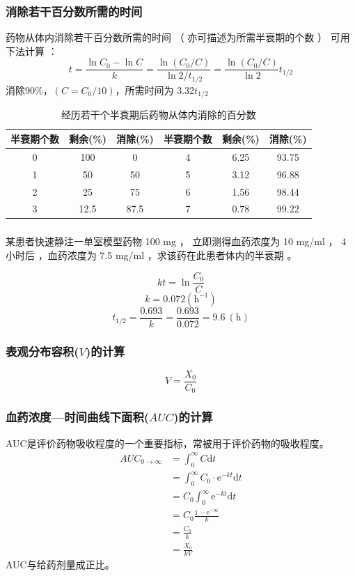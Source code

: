 \documentclass[dvipsnames, svgnames, x11names]{beamer}
\begin{document}
\begin{frame}[t]
    \frametitle{消除若干百分数所需的时间}    
    药物从体内消除若干百分数所需的时间 （ 亦可描述为所需半衰期的个数 ） 可用下法计算 ：
    \[
        t=\frac{\ln C_{0}-\ln C}{k}=\frac{\ln(C_{0}/C)}{\ln2/t_{1/2}}=\frac{\ln(C_{0}/C)}{\ln2}t_{1/2}
    \]
    消除90\%，$(C=C_{0}/10)$，所需时间为 3.32$t_{1/2}$
    \begin{table}
        \centering
        \begin{tabular}{ccc|ccc}
            \bottomrule
            半衰期个数 & 剩余(\%) & 消除(\%) & 半衰期个数 & 剩余(\%) & 消除(\%) \\ \hline
            0 & 100 & 0 & 4 & 6.25 & 93.75 \\ 
            1 & 50 & 50 & 5 & 3.12 & 96.88 \\
            2 & 25 & 75 & 6 & 1.56 & 98.44 \\
            3 & 12.5 & 87.5 & 7 & 0.78 & 99.22 \\ \toprule
        \end{tabular}
        \caption{经历若干个半衰期后药物从体内消除的百分数}
    \end{table}
\end{frame}


\begin{frame}[t]
    \frametitle{}
    \begin{example}
        某患者快速静注一单室模型药物 100 mg ， 立即测得血药浓度为 10 mg/ml ， 4 小时后 ，血药浓度为 7.5 mg/ml ，求该药在此患者体内的半衰期 。
    \end{example}
    \pause
    \[
        kt=\ln\frac{C_{0}}{C}
    \]
    \[
        k=0.072(\mathrm{h}^{-1})
    \]
    \[
        t_{1/2}=\frac{0.693}k=\frac{0.693}{0.072}=9.6\mathrm{~(h)}
    \]
\end{frame}


\begin{frame}[t]
    \frametitle{表观分布容积($V$)的计算}
    \[
        V = \frac{X_0}{C_0}
    \]
    
\end{frame}


\begin{frame}[t]
    \frametitle{血药浓度---时间曲线下面积($AUC$)的计算}
    AUC是评价药物吸收程度的一个重要指标，常被用于评价药物的吸收程度。
    \[
        \begin{aligned}
            AUC_{0\to\infty}&=\int_{0}^{\infty}C\mathrm{d}t \\
            &=\int_0^\infty C_0\cdot\mathrm{e}^{-kt}\mathrm{d}t \\
            &=C_0\int_0^\infty\mathrm{e}^{-kt}\mathrm{d}t \\
            &=C_0 \frac{1-\mathrm{e}^{-\infty}}{k}\\
            &=\frac{C_0}k \\
            &=\frac{X_0}{kV}
        \end{aligned}
    \]
    AUC与给药剂量成正比。
\end{frame}
\end{document}
